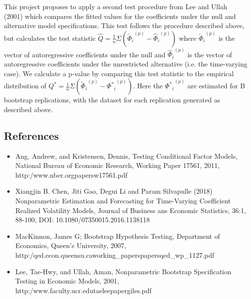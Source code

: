 \documentclass{article}
\begin{document}
This project proposes to apply a second test procedure from Lee and Ullah (2001) which compares the fitted values for the coefficients under the null and alternative model specifications. This test follows the procedure described above, but calculates the test statistic \(\hat{Q} = \frac{1}{n} \Sigma ({\tilde{\Phi}_{i}}^{(p)} - {\hat{\Phi}_{i}}^{(p)} )\) where \({\tilde{\Phi}_{i}}^{(p)}\) is the vector of autoregressive coefficients under the null and \({\hat{\Phi}_{i}}^{(p)} \) is the vector of autoregressive coefficients under the unrestricted alternative (i.e. the time-varying case). We calculate a p-value by comparing this test statistic to the empirical distribution of \(Q^{*} = \frac{1}{n} \Sigma ({\tilde{\Phi}_{i}}^{(p)} - {{{\Phi}^{*}}_{i}}^{(p)} )\). Here the \({{{\Phi}^{*}}_{i}}^{(p)}\) are estimated for B bootstrap replications, with the dataset for each replication generated as described above.

\subsection*{References}

\renewcommand{\theenumi}{\Roman{enumi}}
\begin{itemize}
	\item{Ang, Andrew, and Kristensen, Dennis, Testing Conditional Factor Models, National Bureau of Economic Research, Working Paper 17561, 2011, http:\//www.nber.org\/papers\/w17561.pdf}
	\item{Xiangjin B. Chen, Jiti Gao, Degui Li and Param Silvapulle (2018) Nonparametric Estimation and Forecasting for Time-Varying Coefficient Realized Volatility Models, Journal of Business ans Economic Statistics, 36:1, 88-100, DOI: 10.1080/07350015.2016.1138118}
	\item{MacKinnon, James G; Bootstrap Hypothesis Testing, Department of Economics, Queen's University, 2007, http:\//qed.econ.queensu.ca\/working\_papers\/papers\/qed\_wp\_1127.pdf }
	\item{Lee, Tae-Hwy, and Ullah, Aman, Nonparametric Bootstrap Specification Testing in Economic Models, 2001, http:\//www.faculty.ucr.edu\/taelee\/paper\/giles.pdf}
\end{itemize}
\end{document}
